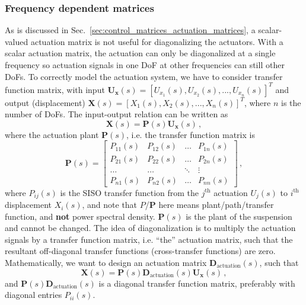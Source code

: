 \subsubsection{Frequency dependent matrices \label{sec:control_matrices_frequency_dependent_matrices}}
As is discussed in Sec.~\ref{sec:control_matrices_actuation_matrices}, a scalar-valued actuation matrix is not useful for diagonalizing the actuators.
With a scalar actuation matrix, the actuation can only be diagonalized at a single frequency so actuation signals in one DoF at other frequencies can still other DoFs.
To correctly model the actuation system, we have to consider transfer function matrix, with input $\mathbf{U}_\mathbf{x}(s)=\left[U_{x_1}(s), U_{x_2}(s),...,U_{x_n}(s)\right]^T$ and output (displacement) $\mathbf{X}(s)=[X_1(s), X_2(s),..., X_n(s)]^T$, where $n$ is the number of  DoFs.
The input-output relation can be written as
\begin{equation}
	\mathbf{X}(s) = \mathbf{P}(s)\mathbf{U}_\mathbf{x}(s)\,,
\end{equation}
where the actuation plant $\mathbf{P}(s)$, i.e. the transfer function matrix is
\begin{equation}
	\mathbf{P}(s)=
	\begin{bmatrix}
		P_{11}(s) & P_{12}(s) & \dots & P_{1n}(s)\\
		P_{21}(s) & P_{22}(s) & \dots & P_{2n}(s)\\
		\dots & \dots & \ddots & \vdots\\
		P_{n1}(s) & P_{n2}(s) & \dots & P_{nn}(s)
	\end{bmatrix}\,,
\end{equation}
where $P_{ij}(s)$ is the SISO transfer function from the $j^\mathrm{th}$ actuation $U_j(s)$ to $i^\mathrm{th}$ displacement $X_i(s)$, and note that $P$/$\mathbf{P}$ here means plant/path/transfer function, and \textbf{not} power spectral density.
$\mathbf{P}(s)$ is the plant of the suspension and cannot be changed. 
The idea of diagonalization is to multiply the actuation signals by a transfer function matrix, i.e. ``the'' actuation matrix, such that the resultant off-diagonal transfer functions (cross-transfer functions) are zero.
Mathematically, we want to design an actuation matrix $\mathbf{D}_\mathrm{actuation}(s)$, such that
\begin{equation}
	\mathbf{X}(s) = \mathbf{P}(s)\mathbf{D}_\mathrm{actuation}(s)\mathbf{U}_\mathbf{x}(s)\,,
\end{equation}
and $\mathbf{P}(s)\mathbf{D}_\mathrm{actuation}(s)$ is a diagonal transfer function matrix, preferably with diagonal entries $P_{ii}(s)$.
